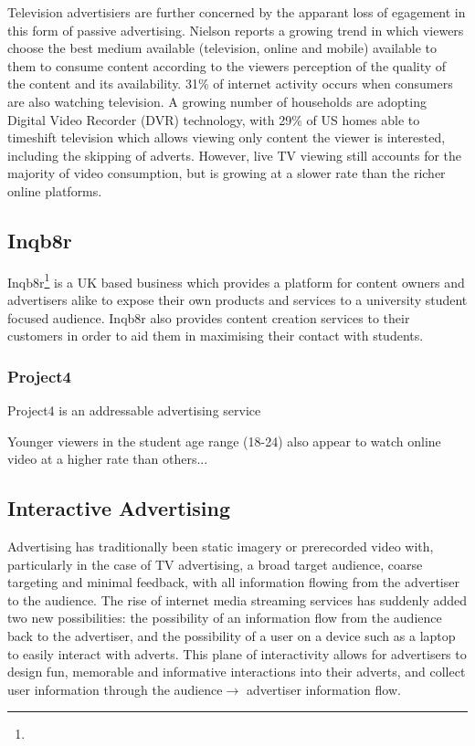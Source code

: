 	Television advertisiers are further concerned by the apparant loss of egagement in this form of passive advertising. Nielson reports a growing trend in which viewers choose the best medium available (television, online and mobile) available to them to consume content according to the viewers perception of the quality of the content and its availability. 31\% of internet activity occurs when consumers are also watching television. A growing number of households are adopting Digital Video Recorder (DVR) technology, with 29\% of US homes able to timeshift television which allows viewing only content the viewer is interested, including the skipping of adverts. However, live TV viewing still accounts for the majority of video consumption, but is growing at a slower rate than the richer online platforms. \cite{three-screen}


	\subsection{Inqb8r}

	Inqb8r\footnote{} is a UK based business which provides a platform for content owners and advertisers alike to expose their own products and services to a university student focused audience. Inqb8r also provides content creation services to their customers in order to aid them in maximising their contact with students.

	\subsubsection{Project4}

	Project4 is an addressable advertising service

	Younger viewers in the student age range (18-24) also appear to watch online video at a higher rate than others...


	\subsection{Interactive Advertising}

	Advertising has traditionally been static imagery or prerecorded video with, particularly in the case of TV advertising, a broad target audience, coarse targeting and minimal feedback, with all information flowing from the advertiser to the audience. The rise of internet media streaming services has suddenly added two new possibilities: the possibility of an information flow from the audience back to the advertiser, and the possibility of a user on a device such as a laptop to easily interact with adverts. This plane of interactivity allows for advertisers to design fun, memorable and informative interactions into their adverts, and collect user information through the audience$\rightarrow$ advertiser information flow.

